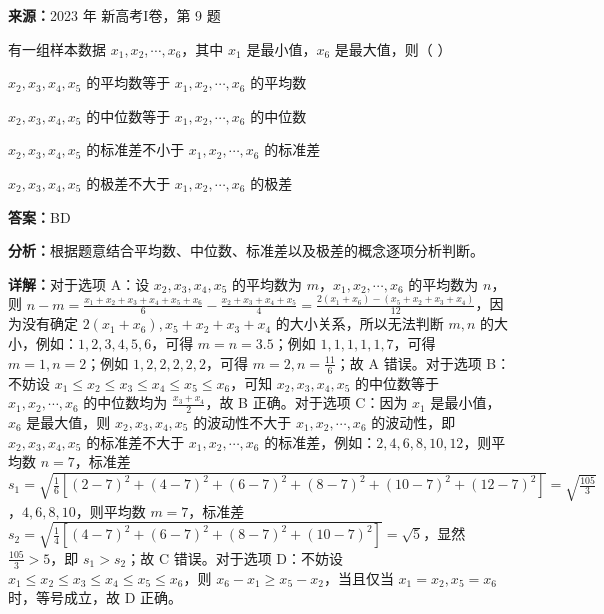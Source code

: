 \begin{question}[points=5]
\textbf{来源：}2023 年 新高考I卷，第 9 题\par
有一组样本数据 $x_1, x_2, \cdots, x_6$，其中 $x_1$ 是最小值，$x_6$ 是最大值，则（ ）
\begin{choices}
  \item $x_2, x_3, x_4, x_5$ 的平均数等于 $x_1, x_2, \cdots, x_6$ 的平均数
  \item $x_2, x_3, x_4, x_5$ 的中位数等于 $x_1, x_2, \cdots, x_6$ 的中位数
  \item $x_2, x_3, x_4, x_5$ 的标准差不小于 $x_1, x_2, \cdots, x_6$ 的标准差
  \item $x_2, x_3, x_4, x_5$ 的极差不大于 $x_1, x_2, \cdots, x_6$ 的极差
\end{choices}
\begin{solution}
\textbf{答案：}BD

\textbf{分析：}根据题意结合平均数、中位数、标准差以及极差的概念逐项分析判断。

\textbf{详解：}对于选项 A：设 $x_2, x_3, x_4, x_5$ 的平均数为 $m$，$x_1, x_2, \cdots, x_6$ 的平均数为 $n$，则 $n-m=\frac{x_1+x_2+x_3+x_4+x_5+x_6}{6}-\frac{x_2+x_3+x_4+x_5}{4}=\frac{2(x_1+x_6)-(x_5+x_2+x_3+x_4)}{12}$，因为没有确定 $2(x_1+x_6), x_5+x_2+x_3+x_4$ 的大小关系，所以无法判断 $m,n$ 的大小，例如：$1,2,3,4,5,6$，可得 $m=n=3.5$；例如 $1,1,1,1,1,7$，可得 $m=1, n=2$；例如 $1,2,2,2,2,2$，可得 $m=2, n=\frac{11}{6}$；故 A 错误。对于选项 B：不妨设 $x_1\leq x_2\leq x_3\leq x_4\leq x_5\leq x_6$，可知 $x_2, x_3, x_4, x_5$ 的中位数等于 $x_1, x_2, \cdots, x_6$ 的中位数均为 $\frac{x_3+x_4}{2}$，故 B 正确。对于选项 C：因为 $x_1$ 是最小值，$x_6$ 是最大值，则 $x_2, x_3, x_4, x_5$ 的波动性不大于 $x_1, x_2, \cdots, x_6$ 的波动性，即 $x_2, x_3, x_4, x_5$ 的标准差不大于 $x_1, x_2, \cdots, x_6$ 的标准差，例如：$2,4,6,8,10,12$，则平均数 $n=7$，标准差 $s_1=\sqrt{\frac{1}{6}[(2-7)^2+(4-7)^2+(6-7)^2+(8-7)^2+(10-7)^2+(12-7)^2]}=\sqrt{\frac{105}{3}}$，$4,6,8,10$，则平均数 $m=7$，标准差 $s_2=\sqrt{\frac{1}{4}[(4-7)^2+(6-7)^2+(8-7)^2+(10-7)^2]}=\sqrt{5}$，显然 $\frac{105}{3}>5$，即 $s_1>s_2$；故 C 错误。对于选项 D：不妨设 $x_1\leq x_2\leq x_3\leq x_4\leq x_5\leq x_6$，则 $x_6-x_1\geq x_5-x_2$，当且仅当 $x_1=x_2, x_5=x_6$ 时，等号成立，故 D 正确。
\end{solution}
\end{question}


